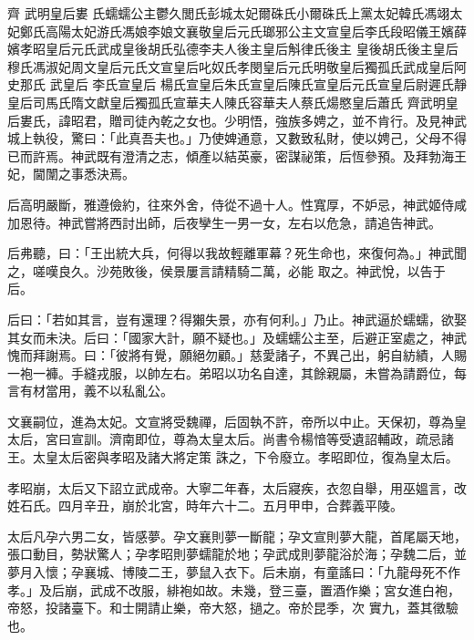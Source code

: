 
\begin{pinyinscope}

 齊
 武明皇后婁
 氏蠕蠕公主鬱久閭氏彭城太妃爾硃氏小爾硃氏上黨太妃韓氏馮翊太妃鄭氏高陽太妃游氏馮娘李娘文襄敬皇后元氏瑯邪公主文宣皇后李氏段昭儀王嬪薛嬪孝昭皇后元氏武成皇後胡氏弘德李夫人後主皇后斛律氏後主
 皇後胡氏後主皇后穆氏馮淑妃周文皇后元氏文宣皇后叱奴氏孝閔皇后元氏明敬皇后獨孤氏武成皇后阿史那氏
 武皇后
 李氏宣皇后
 楊氏宣皇后朱氏宣皇后陳氏宣皇后元氏宣皇后尉遲氏靜皇后司馬氏隋文獻皇后獨孤氏宣華夫人陳氏容華夫人蔡氏煬愍皇后蕭氏
 齊武明皇后婁氏，諱昭君，贈司徒內乾之女也。少明悟，強族多娉之，並不肯行。及見神武城上執役，驚曰：「此真吾夫也。」乃使婢通意，又數致私財，使以娉己，父母不得已而許焉。神武既有澄清之志，傾產以結英豪，密謀祕策，后恆參預。及拜勃海王妃，閫闈之事悉決焉。



 后高明嚴斷，雅遵儉約，往來外舍，侍從不過十人。性寬厚，不妒忌，神武姬侍咸加恩待。神武嘗將西討出師，后夜孿生一男一女，左右以危急，請追告神武。



 后弗聽，曰：「王出統大兵，何得以我故輕離軍幕？死生命也，來復何為。」神武聞之，嗟嘆良久。沙苑敗後，侯景屢言請精騎二萬，必能
 取之。神武悅，以告于后。



 后曰：「若如其言，豈有還理？得獺失景，亦有何利。」乃止。神武逼於蠕蠕，欲娶其女而未決。后曰：「國家大計，願不疑也。」及蠕蠕公主至，后避正室處之，神武愧而拜謝焉。曰：「彼將有覺，願絕勿顧。」慈愛諸子，不異己出，躬自紡績，人賜一袍一褲。手縫戎服，以帥左右。弟昭以功名自達，其餘親屬，未嘗為請爵位，每言有材當用，義不以私亂公。



 文襄嗣位，進為太妃。文宣將受魏禪，后固執不許，帝所以中止。天保初，尊為皇太后，宮曰宣訓。濟南即位，尊為太皇太后。尚書令楊愔等受遺詔輔政，疏忌諸王。太皇太后密與孝昭及諸大將定策
 誅之，下令廢立。孝昭即位，復為皇太后。



 孝昭崩，太后又下詔立武成帝。大寧二年春，太后寢疾，衣忽自舉，用巫媼言，改姓石氏。四月辛丑，崩於北宮，時年六十二。五月甲申，合葬義平陵。



 太后凡孕六男二女，皆感夢。孕文襄則夢一斷龍；孕文宣則夢大龍，首尾屬天地，張口動目，勢狀驚人；孕孝昭則夢蠕龍於地；孕武成則夢龍浴於海；孕魏二后，並夢月入懷；孕襄城、博陵二王，夢鼠入衣下。后未崩，有童謠曰：「九龍母死不作孝。」及后崩，武成不改服，緋袍如故。未幾，登三臺，置酒作樂；宮女進白袍，帝怒，投諸臺下。和士開請止樂，帝大怒，撾之。帝於昆季，次
 實九，蓋其徵驗也。




\end{pinyinscope}
